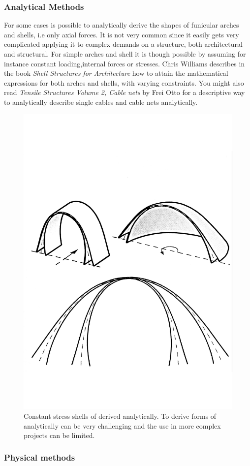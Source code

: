 \subsubsection{Analytical Methods}

For some cases is possible to analytically derive the shapes of funicular arches and shells, i.e only axial forces. It is not very common since it easily gets very complicated applying it to complex demands on a structure, both architectural and structural. For simple arches and shell it is though possible by assuming for instance constant loading,internal forces or stresses.  Chris Williams describes in the book \textit{Shell Structures for Architecture} how to attain the mathematical expressions for both arches and shells, with varying constraints.
You might also read \textit{ Tensile Structures Volume 2,  Cable nets} by Frei Otto for a descriptive way to analytically describe single cables and cable nets analytically. 

\begin{figure}[H]
\centering
\includegraphics[width=0.6\linewidth ]{figure/Introduction/constantShell.pdf}
\caption{Constant stress shells of derived analytically. To derive forms of analytically can be very challenging and the use in more complex projects can be limited.\cite{ref:ShellOpt} }
\end{figure}


\subsubsection{Physical methods}

